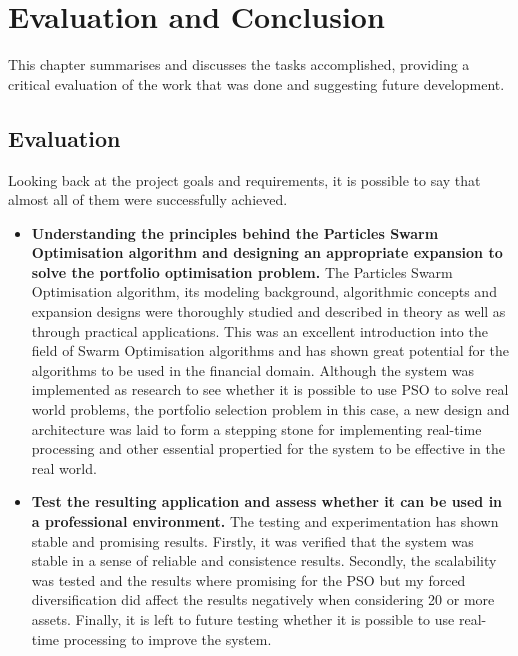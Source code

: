 \chapter{Evaluation and Conclusion}
This chapter summarises and discusses the tasks accomplished, providing a critical evaluation of the work that was done and suggesting future development.

  \section{Evaluation} %
  \label{sec:evaluation}
  Looking back at the project goals and requirements, it is possible to say that almost all of them were successfully achieved. 
  \begin{itemize}
    \item \textbf{Understanding the principles behind the Particles Swarm Optimisation algorithm and designing an appropriate expansion to solve the portfolio optimisation problem.} The Particles Swarm Optimisation algorithm, its modeling background, algorithmic concepts and expansion designs were thoroughly studied and described in theory as well as through practical applications. This was an excellent introduction into the field of Swarm Optimisation algorithms and has shown great potential for the algorithms to be used in the financial domain. Although the system was implemented as research to see whether it is possible to use PSO to solve real world problems, the portfolio selection problem in this case, a new design and architecture was laid to form a stepping stone for implementing real-time processing and other essential propertied for the system to be effective in the real world.
    \item \textbf{Test the resulting application and assess whether it can be used in a professional environment.} The testing and experimentation has shown stable and promising results. Firstly, it was verified that the system was stable in a sense of reliable and consistence results. Secondly, the scalability was tested and the results where promising for the PSO but my forced diversification did affect the results negatively when considering 20 or more assets. Finally, it is left to future testing whether it is possible to use real-time processing to improve the system.
  \end{itemize}

